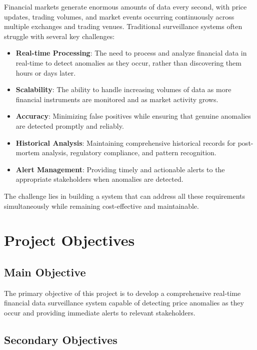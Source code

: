 Financial markets generate enormous amounts of data every second, with price updates, trading volumes, and market events occurring continuously across multiple exchanges and trading venues. Traditional surveillance systems often struggle with several key challenges:
% 
\begin{itemize}
    \item \textbf{Real-time Processing}: The need to process and analyze financial data in real-time to detect anomalies as they occur, rather than discovering them hours or days later.
    
    \item \textbf{Scalability}: The ability to handle increasing volumes of data as more financial instruments are monitored and as market activity grows.
    
    \item \textbf{Accuracy}: Minimizing false positives while ensuring that genuine anomalies are detected promptly and reliably.
    
    \item \textbf{Historical Analysis}: Maintaining comprehensive historical records for post-mortem analysis, regulatory compliance, and pattern recognition.
    
    \item \textbf{Alert Management}: Providing timely and actionable alerts to the appropriate stakeholders when anomalies are detected.
\end{itemize}

The challenge lies in building a system that can address all these requirements simultaneously while remaining cost-effective and maintainable.

\section{Project Objectives}

\subsection{Main Objective}

The primary objective of this project is to develop a comprehensive real-time financial data surveillance system capable of detecting price anomalies as they occur and providing immediate alerts to relevant stakeholders.

\subsection{Secondary Objectives}


